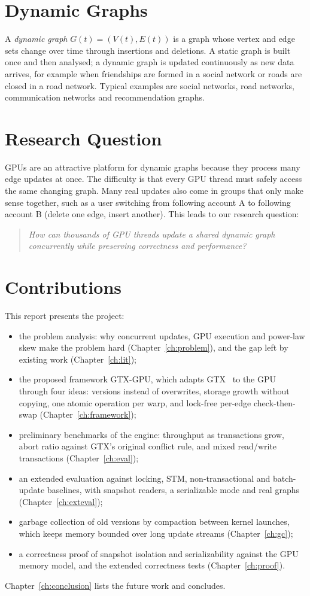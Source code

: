 \documentclass[11pt,a4paper,oneside]{report}
\newcommand{\sys}{GTX-GPU}
\begin{document}
\section{Dynamic Graphs}
A \emph{dynamic graph} $G(t) = (V(t), E(t))$ is a graph whose vertex and edge sets change over time through insertions
and deletions. A static graph is built once and then analysed; a dynamic graph is updated continuously as new data
arrives, for example when friendships are formed in a social network or roads are closed in a road network. Typical
examples are social networks, road networks, communication networks and recommendation graphs.

\section{Research Question}
GPUs are an attractive platform for dynamic graphs because they process many edge updates at once. The difficulty is
that every GPU thread must safely access the same changing graph. Many real updates also come in groups that only make
sense together, such as a user switching from following account A to following account B (delete one edge, insert
another). This leads to our research question:
\begin{quote}
\emph{How can thousands of GPU threads update a shared dynamic graph concurrently while preserving correctness and
performance?}
\end{quote}

\section{Contributions}
This report presents the project:
\begin{itemize}
\item the problem analysis: why concurrent updates, GPU execution and power-law skew make the problem hard
  (Chapter~\ref{ch:problem}), and the gap left by existing work (Chapter~\ref{ch:lit});
\item the proposed framework \sys{}, which adapts GTX~\cite{gtx} to the GPU through four ideas: versions instead of
  overwrites, storage growth without copying, one atomic operation per warp, and lock-free per-edge check-then-swap
  (Chapter~\ref{ch:framework});
\item preliminary benchmarks of the engine: throughput as transactions grow, abort ratio against GTX's original
  conflict rule, and mixed read/write transactions (Chapter~\ref{ch:eval});
\item an extended evaluation against locking, STM, non-transactional and batch-update baselines, with snapshot
  readers, a serializable mode and real graphs (Chapter~\ref{ch:exteval});
\item garbage collection of old versions by compaction between kernel launches, which keeps memory bounded over
  long update streams (Chapter~\ref{ch:gc});
\item a correctness proof of snapshot isolation and serializability against the GPU memory model, and the extended
  correctness tests (Chapter~\ref{ch:proof}).
\end{itemize}
Chapter~\ref{ch:conclusion} lists the future work and concludes.
\end{document}
